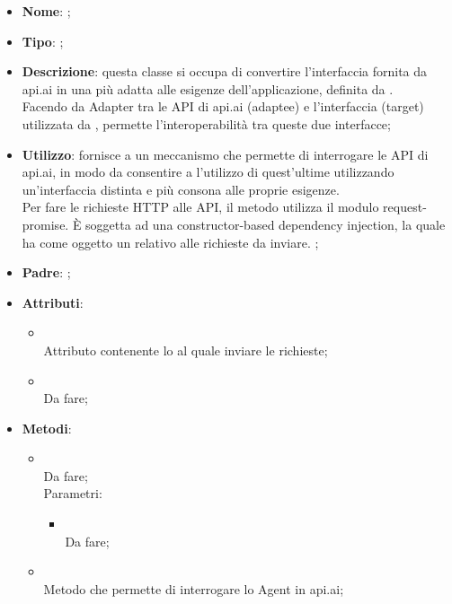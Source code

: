 \begin{itemize}
	\item \textbf{Nome}: ;
	\item \textbf{Tipo}: ;
	\item \textbf{Descrizione}: questa classe si occupa di convertire l'interfaccia fornita da api.ai in una più adatta alle esigenze dell'applicazione, definita da . \\
Facendo da Adapter tra le API di api.ai (adaptee) e l'interfaccia  (target) utilizzata da , permette l'interoperabilità tra queste due interfacce;
	\item \textbf{Utilizzo}: fornisce a  un meccanismo che permette di interrogare le API di api.ai, in modo da consentire a  l'utilizzo di quest'ultime utilizzando un'interfaccia distinta e più consona alle proprie esigenze. \\ Per fare le richieste HTTP alle API, il metodo  utilizza il modulo request-promise.
È soggetta ad una constructor-based dependency injection, la quale ha come oggetto un  relativo alle richieste da inviare. ;
	\item \textbf{Padre}: ;
	\item \textbf{Attributi}:
	\begin{itemize}
		\item[]  \\
		Attributo contenente lo  al quale inviare le richieste;
		\item[]  \\
		Da fare;
	\end{itemize}
	\item \textbf{Metodi}:
	\begin{itemize}
		\item[]  \\
		Da fare;\\
		Parametri:
		\begin{itemize}
			\item {} \\
			Da fare;
		\end{itemize}
		\item[]  \\
		Metodo che permette di interrogare lo Agent in api.ai;\\

\end{itemize}
\end{itemize}
